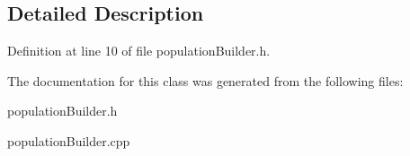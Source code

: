 \subsection{Detailed Description}


Definition at line 10 of file population\+Builder.\+h.



The documentation for this class was generated from the following files\+:\begin{DoxyCompactItemize}
\item 
population\+Builder.\+h\item 
population\+Builder.\+cpp\end{DoxyCompactItemize}
